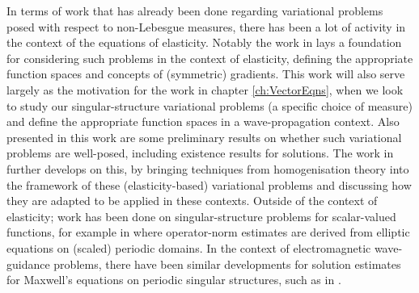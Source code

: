 In terms of work that has already been done regarding variational problems posed with respect to non-Lebesgue measures, there has been a lot of activity in the context of the equations of elasticity.
Notably the work in \cite{zhikov2000extension} lays a foundation for considering such problems in the context of elasticity, defining the appropriate function spaces and concepts of (symmetric) gradients.
This work will also serve largely as the motivation for the work in chapter \ref{ch:VectorEqns}, when we look to study our singular-structure variational problems (a specific choice of measure) and define the appropriate function spaces in a wave-propagation context.
Also presented in this work are some preliminary results on whether such variational problems are well-posed, including existence results for solutions.
The work in \cite{zhikov2002homogenization} further develops on this, by bringing techniques from homogenisation theory into the framework of these (elasticity-based) variational problems and discussing how they are adapted to be applied in these contexts. 
Outside of the context of elasticity; work has been done on singular-structure problems for scalar-valued functions, for example in \cite{cherednichenko2018elliptic} where operator-norm estimates are derived from elliptic equations on (scaled) periodic domains. 
In the context of electromagnetic wave-guidance problems, there have been similar developments for solution estimates for Maxwell's equations on periodic singular structures, such as in \cite{cherednichenko2018maxwell}. 


